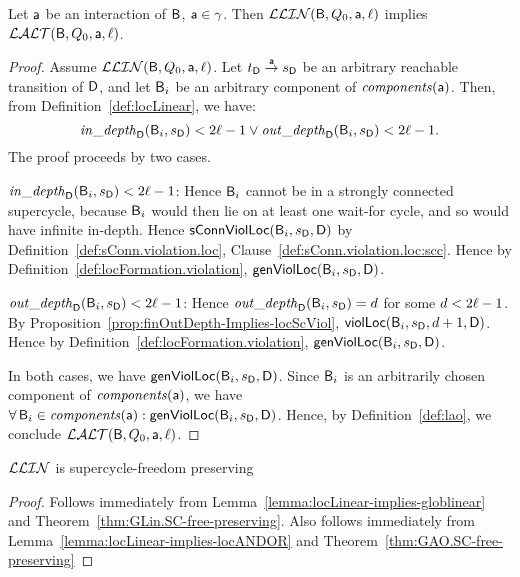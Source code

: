 \begin{lemma}
\label{lemma:locLinear-implies-locANDOR}
\label{LLinLAO}
Let $\act$ be an interaction of $\B$, \ie $\act \in \gamma$.
Then $\LLin(\B, Q_0, \act, \l)$ implies $\LAO(\B, Q_0, \act, \l)$.
\end{lemma}
%
\begin{proof}
Assume $\LLin(\B, Q_0, \act, \l)$. Let $\tD \goesto[\act] \sD$ be an arbitrary reachable transition of $\dsk{\act}{\l}$,
and let $\B_i$ be an arbitrary component of $\cmps{\act}$.
Then, from Definition~\ref{def:locLinear}, we have:
  $$\widepth{\dsk{\act}{\l}}{\B_i}{\sD} < 2\l-1 \lor \wodepth{\dsk{\act}{\l}}{\B_i}{\sD} < 2\l-1.$$
The proof proceeds by two cases. 

\vspace{1.0ex}
\ul{ $\widepth{\dsk{\act}{\l}}{\B_i}{\sD} < 2\l-1$}:
Hence $\B_i$ cannot be in a strongly connected supercycle, because $\B_i$ would then lie on at least one wait-for cycle, and so would have infinite
in-depth. Hence $\locConnViol{\B_i}{\sD}{\act}{\l}$ by Definition~\ref{def:sConn.violation.loc}, Clause~\ref{def:sConn.violation.loc:scc}.
Hence by Definition~\ref{def:locFormation.violation}, $\locFormViol{\B_i}{\sD}{\act}{\l}$.

\vspace{1.0ex}
\ul{$\wodepth{\dsk{\act}{\l}}{\B_i}{\sD} < 2\l-1$}:
Hence $\wodepth{\dsk{\act}{\l}}{\B_i}{\sD} = d$ for some $d < 2\l-1$.
By Proposition~\ref{prop:finOutDepth-Implies-locScViol}, $\locScViol{\B_i}{d+1}{\sD}{\act}{\l}$.
Hence by Definition~\ref{def:locFormation.violation}, $\locFormViol{\B_i}{\sD}{\act}{\l}$.

\noindent
In both cases, we have $\locFormViol{\B_i}{\sD}{\act}{\l}$.
Since $\B_i$ is an arbitrarily chosen  component of $\cmps{\act}$, we have $\fa \B_i \in \cmps{\act} : \locFormViol{\B_i}{\sD}{\act}{\l}$.
Hence, by Definition~\ref{def:lao}, we conclude $\LAO(\B, Q_0, \act, \l)$.
\end{proof}



\begin{theorem} \label{thm:LLin.SC-free-preserving}
$\LLin$ is supercycle-freedom preserving
\end{theorem}
%
\begin{proof}
Follows immediately from
Lemma~\ref{lemma:locLinear-implies-globlinear} and
Theorem~\ref{thm:GLin.SC-free-preserving}.
%
Also follows immediately from Lemma~\ref{lemma:locLinear-implies-locANDOR} and Theorem~\ref{thm:GAO.SC-free-preserving}
\end{proof}